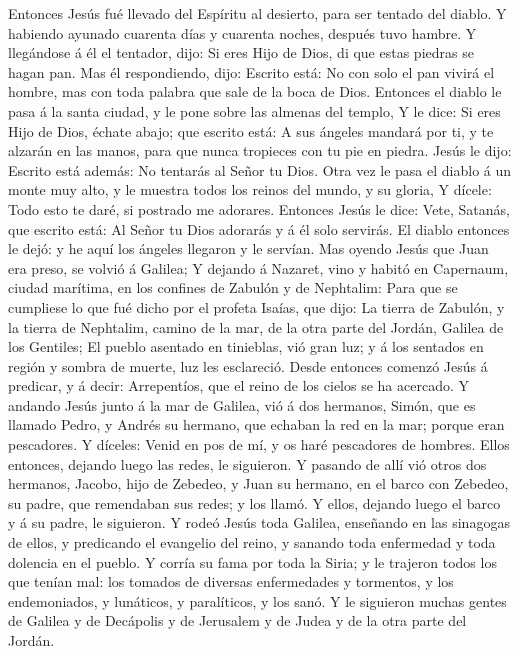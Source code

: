  Entonces Jesús fué llevado del Espíritu al desierto, para
ser tentado del diablo.  Y habiendo ayunado cuarenta días
y cuarenta noches, después tuvo hambre.  Y llegándose á él
el tentador, dijo: Si eres Hijo de Dios, di que estas piedras se hagan
pan.  Mas él respondiendo, dijo: Escrito está: No con solo
el pan vivirá el hombre, mas con toda palabra que sale de la boca de
Dios.  Entonces el diablo le pasa á la santa ciudad, y le
pone sobre las almenas del templo,  Y le dice: Si eres
Hijo de Dios, échate abajo; que escrito está: A sus ángeles mandará por
ti, y te alzarán en las manos, para que nunca tropieces con tu pie en
piedra.  Jesús le dijo: Escrito está además: No tentarás
al Señor tu Dios.  Otra vez le pasa el diablo á un monte
muy alto, y le muestra todos los reinos del mundo, y su gloria,
 Y dícele: Todo esto te daré, si postrado me adorares.
 Entonces Jesús le dice: Vete, Satanás, que escrito está:
Al Señor tu Dios adorarás y á él solo servirás.  El
diablo entonces le dejó: y he aquí los ángeles llegaron y le servían.
 Mas oyendo Jesús que Juan era preso, se volvió á
Galilea;  Y dejando á Nazaret, vino y habitó en
Capernaum, ciudad marítima, en los confines de Zabulón y de Nephtalim:
 Para que se cumpliese lo que fué dicho por el profeta
Isaías, que dijo:  La tierra de Zabulón, y la tierra de
Nephtalim, camino de la mar, de la otra parte del Jordán, Galilea de los
Gentiles;  El pueblo asentado en tinieblas, vió gran luz;
y á los sentados en región y sombra de muerte, luz les esclareció.
 Desde entonces comenzó Jesús á predicar, y á decir:
Arrepentíos, que el reino de los cielos se ha acercado. 
Y andando Jesús junto á la mar de Galilea, vió á dos hermanos, Simón,
que es llamado Pedro, y Andrés su hermano, que echaban la red en la mar;
porque eran pescadores.  Y díceles: Venid en pos de mí, y
os haré pescadores de hombres.  Ellos entonces, dejando
luego las redes, le siguieron.  Y pasando de allí vió
otros dos hermanos, Jacobo, hijo de Zebedeo, y Juan su hermano, en el
barco con Zebedeo, su padre, que remendaban sus redes; y los llamó.
 Y ellos, dejando luego el barco y á su padre, le
siguieron.  Y rodeó Jesús toda Galilea, enseñando en las
sinagogas de ellos, y predicando el evangelio del reino, y sanando toda
enfermedad y toda dolencia en el pueblo.  Y corría su
fama por toda la Siria; y le trajeron todos los que tenían mal: los
tomados de diversas enfermedades y tormentos, y los endemoniados, y
lunáticos, y paralíticos, y los sanó.  Y le siguieron
muchas gentes de Galilea y de Decápolis y de Jerusalem y de Judea y de
la otra parte del Jordán.


